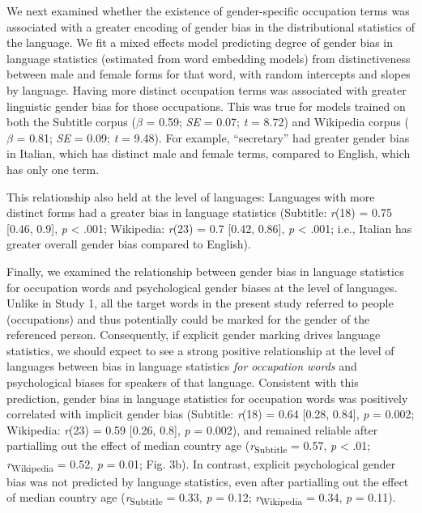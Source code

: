 \documentclass[9pt,twocolumn,twoside,lineno]{pnas-new}
\begin{document}
We next examined whether the existence of gender-specific occupation terms was associated with a greater encoding of gender bias in the distributional statistics of the language. We fit a mixed effects model predicting degree of gender bias in language statistics (estimated from word embedding models) from distinctiveness between male and female forms for that word, with random intercepts and slopes by language. Having more distinct occupation terms was associated with greater linguistic gender bias for those occupations. This was true for models trained on both the Subtitle corpus (\(\beta\) = 0.59; \emph{SE} = 0.07; \emph{t} = 8.72) and Wikipedia
corpus (\(\beta\) = 0.81; \emph{SE} = 0.09; \emph{t} = 9.48). For example, \enquote{secretary} had greater gender bias in Italian, which has distinct male and female terms, compared to English, which has only one term. 

This relationship also held at the level of languages: Languages with more
distinct forms had a greater bias in language statistics
(Subtitle: \emph{r}(18) = 0.75 {[}0.46, 0.9{]}, \emph{p} \textless{} .001; Wikipedia: \emph{r}(23) = 0.7 {[}0.42, 0.86{]}, \emph{p} \textless{} .001; i.e., Italian has greater overall gender bias compared to English).

Finally, we examined the relationship between gender bias in language
statistics for occupation words and psychological gender biases at the level of languages.
Unlike in Study 1, all the target words in the present study referred to
people (occupations) and thus potentially could be marked for the gender
of the referenced person. Consequently, if explicit gender marking
drives language statistics, we should expect to see a strong positive
relationship at the level of languages between bias in language
statistics \emph{for occupation words} and psychological biases for
speakers of that language. Consistent with this prediction, gender bias
in language statistics for occupation words was positively correlated
with implicit gender bias (Subtitle: \emph{r}(18) = 0.64 {[}0.28, 0.84{]}, \emph{p} =  0.002; Wikipedia: \emph{r}(23) = 0.59 {[}0.26, 0.8{]}, \emph{p} = 0.002),
and remained reliable after partialling out the effect of median country
age (\emph{r}\textsubscript{Subtitle} = 0.57, \emph{p} \textless{} .01; \emph{r}\textsubscript{Wikipedia}  = 0.52, \emph{p} = 0.01; Fig. 3b). In contrast,  explicit psychological gender bias was not predicted by language statistics, even after partialling out the effect of median country age (\emph{r}\textsubscript{Subtitle} = 0.33, \emph{p} = 0.12;
\emph{r}\textsubscript{Wikipedia} = 0.34, \emph{p} = 0.11).
\end{document}
